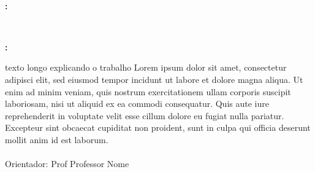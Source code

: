 \begin{center}

    \thispagestyle{pretext}
    \ \\ 

    \begin{large}
        \printAuthors
    \end{large}
    

    \vfill

    \begin{Large}
        \textbf{\uppercase\expandafter{\TitleNameEnglish}:} \\
        \textbf{\uppercase\expandafter{\SubtitleNameEnglish}}
    \end{Large} \\
    \begin{Large}
        \textbf{\uppercase\expandafter{\TitleName}:} \\
        \textbf{\uppercase\expandafter{\SubtitleName}}
    \end{Large}

\end{center}

\vspace{3em}

\begin{adjustwidth}{7.5cm}{}
    \noindent texto longo explicando o trabalho Lorem ipsum dolor sit amet, consectetur adipisci elit, sed eiusmod tempor incidunt ut labore et dolore magna aliqua. Ut enim ad minim veniam, quis nostrum exercitationem ullam corporis suscipit laboriosam, nisi ut aliquid ex ea commodi consequatur. Quis aute iure reprehenderit in voluptate velit esse cillum dolore eu fugiat nulla pariatur. Excepteur sint obcaecat cupiditat non proident, sunt in culpa qui officia deserunt mollit anim id est laborum. \\ \ \\
    Orientador: Prof Professor Nome
\end{adjustwidth}

\vfill

\begin{center}
    \begin{large}
        \printCity \\
        \the \year
    \end{large}
\end{center}

\newpage